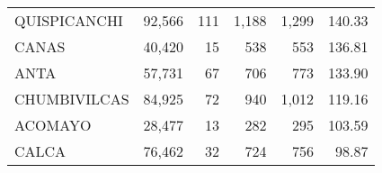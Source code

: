 \begin{tabular}{lrrrrr}
	\cellcolor[HTML]{FFFFC7}QUISPICANCHI                                              & 92,566                                                         & 111                                                      & 1,188                                                    & 1,299                                                               & 140.33                                                                       \\
	\cellcolor[HTML]{FFFFC7}CANAS                                                     & 40,420                                                         & 15                                                       & 538                                                      & 553                                                                 & 136.81                                                                       \\
	\cellcolor[HTML]{FFFFC7}ANTA                                                      & 57,731                                                         & 67                                                       & 706                                                      & 773                                                                 & 133.90                                                                       \\
	\cellcolor[HTML]{9AFF99}CHUMBIVILCAS                                              & 84,925                                                         & 72                                                       & 940                                                      & 1,012                                                               & 119.16                                                                       \\
	\cellcolor[HTML]{9AFF99}ACOMAYO                                                   & 28,477                                                         & 13                                                       & 282                                                      & 295                                                                 & 103.59                                                                       \\
	\cellcolor[HTML]{9AFF99}CALCA                                                     & 76,462                                                         & 32                                                       & 724                                                      & 756                                                                 & 98.87                                                                        \\

\end{tabular}
